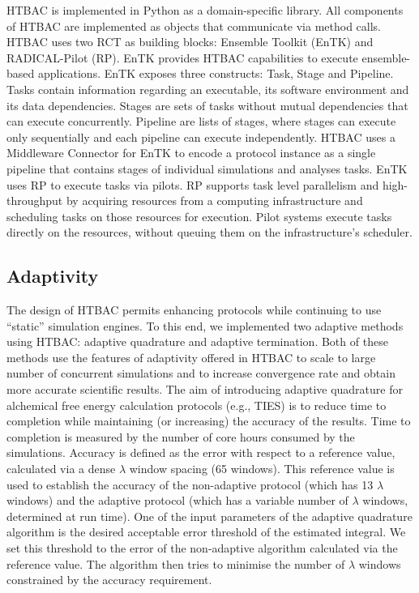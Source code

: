 HTBAC is implemented in Python as a domain-specific library. All components of HTBAC are implemented as objects that communicate via method calls. HTBAC uses two RCT as building blocks: Ensemble Toolkit (EnTK) and RADICAL-Pilot (RP).
EnTK provides HTBAC capabilities to execute ensemble-based applications. EnTK exposes three constructs: Task, Stage and Pipeline. Tasks contain information regarding an executable, its software environment and its data dependencies. Stages are sets of tasks without mutual dependencies that can execute concurrently. Pipeline are lists of stages, where stages can execute only sequentially and each pipeline can execute independently. HTBAC uses a Middleware Connector for EnTK to encode a protocol instance as a single pipeline that contains stages of individual simulations and analyses tasks.
EnTK uses RP to execute tasks via pilots. RP supports task level parallelism and high-throughput by acquiring resources from a computing infrastructure and scheduling tasks on those resources for execution. Pilot systems execute tasks directly on the resources, without queuing them on the infrastructure’s scheduler.

\subsection{Adaptivity}

The design of HTBAC permits enhancing protocols while continuing to use ``static'' simulation engines. To this end, we implemented two adaptive methods using HTBAC: adaptive quadrature and adaptive termination. Both of these methods use the features of adaptivity offered in HTBAC to scale to large number of concurrent simulations and to increase convergence rate and obtain more accurate scientific results.
The aim of introducing adaptive quadrature for alchemical free energy calculation protocols (e.g., TIES) is to reduce time to completion while maintaining (or increasing) the accuracy of the results. Time to completion is measured by the number of core hours consumed by the simulations. Accuracy is defined as the error with respect to a reference value, calculated via a dense $\lambda$ window spacing (65 windows). This reference value is used to establish the accuracy of the non-adaptive protocol (which has 13 $\lambda$ windows) and the adaptive protocol (which has a variable number of $\lambda$ windows, determined at run time).
One of the input parameters of the adaptive quadrature algorithm is the desired acceptable error threshold of the estimated integral. We set this threshold to the error of the non-adaptive algorithm calculated via the reference value. The algorithm then tries to minimise the number of $\lambda$ windows constrained by the accuracy requirement.